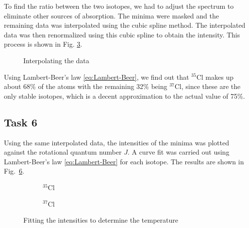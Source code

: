 \documentclass{article}
\begin{document}
\pagebreak{}

To find the ratio between the two isotopes, we had to adjust the spectrum to eliminate other sources of absorption. The minima were masked and the remaining data was interpolated using the cubic spline method. The interpolated data was then renormalized using this cubic spline to obtain the intensity. This process is shown in Fig. \ref{fig:Interpolation}.

\begin{figure}[H]
	\centering
	\begin{subfigure}{0.45\textwidth}
		\centering
		\scalebox{0.50}{}
		\label{fig:original_interpolated_data_p_branch}
	\end{subfigure}
	\hspace{0.5cm}
	\begin{subfigure}{0.45\textwidth}
		\centering
		\scalebox{0.50}{}
		\label{fig:intensity_p_branch}
	\end{subfigure}
	\caption{Interpolating the data}
	\label{fig:Interpolation}
\end{figure}

Using Lambert-Beer's law \ref{eq:Lambert-Beer}, we find out that $^{35} \mathrm{Cl}$ makes up about 68\% of the atoms with the remaining 32\% being $^{37} \mathrm{Cl}$, since these are the only stable isotopes, which is a decent approximation to the actual value of 75\%.

\pagebreak{}

\subsection{Task 6}

Using the same interpolated data, the intensities of the minima was plotted against the rotational quantum number $J$. A curve fit was carried out using Lambert-Beer's law \ref{eq:Lambert-Beer} for each isotope. The results are shown in Fig.~\ref{fig:ClFits}.

\begin{figure}[H]
	\centering
	\begin{subfigure}{0.45\textwidth}
		\centering
		\scalebox{0.50}{}
		\caption{$^{35}$Cl}
		\label{fig:Cl35_intensities}
	\end{subfigure}	
	\hspace{0.5cm}
	\begin{subfigure}{0.45\textwidth}
		\centering
		\scalebox{0.50}{}
		\caption{$^{37}$Cl}
		\label{fig:Cl37_intensities}
	\end{subfigure}
	\caption{Fitting the intensities to determine the temperature}
	\label{fig:ClFits}
\end{figure}
\end{document}
